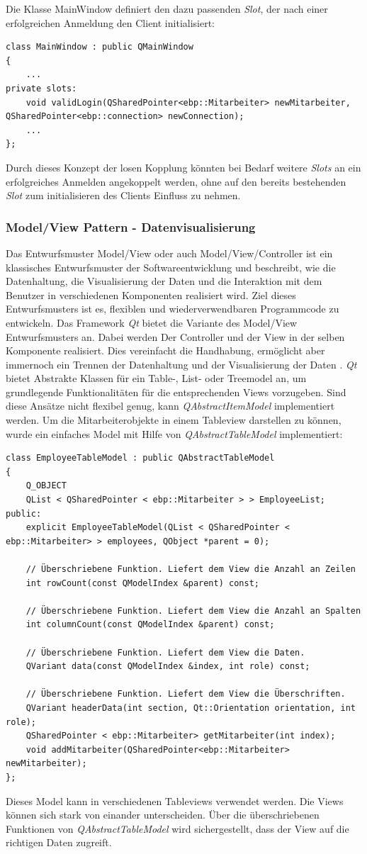 Die Klasse MainWindow definiert den dazu passenden \textit{Slot}, der nach einer erfolgreichen Anmeldung den Client initialisiert:
\begin{lstlisting}
class MainWindow : public QMainWindow
{
    ...
private slots:
    void validLogin(QSharedPointer<ebp::Mitarbeiter> newMitarbeiter, QSharedPointer<ebp::connection> newConnection);
    ...
};
\end{lstlisting}
Durch dieses Konzept der losen Kopplung könnten bei Bedarf weitere \textit{Slots} an ein erfolgreiches Anmelden angekoppelt werden, ohne auf den bereits bestehenden \textit{Slot} zum initialisieren des Clients Einfluss zu nehmen.
\subsubsection{Model/View Pattern - Datenvisualisierung}
Das Entwurfsmuster Model/View oder auch Model/View/Controller ist ein klassisches Entwurfsmuster der Softwareentwicklung und beschreibt, wie die Datenhaltung, die Visualisierung der Daten und die Interaktion mit dem Benutzer in verschiedenen Komponenten realisiert wird. Ziel dieses Entwurfsmusters ist es, flexiblen und wiederverwendbaren Programmcode zu entwickeln.
Das Framework \textit{Qt} bietet die Variante des Model/View Entwurfsmusters an. Dabei werden Der Controller und der View in der selben Komponente realisiert. Dies vereinfacht die Handhabung, ermöglicht aber immernoch ein Trennen der Datenhaltung und der Visualisierung der Daten \cite[Vgl.]{QtModelView}.
\textit{Qt} bietet Abstrakte Klassen für ein Table-, List- oder Treemodel an, um grundlegende Funktionalitäten für die entsprechenden Views vorzugeben. Sind diese Ansätze nicht flexibel genug, kann \textit{QAbstractItemModel} implementiert werden. Um die Mitarbeiterobjekte in einem Tableview darstellen zu können, wurde ein einfaches Model mit Hilfe von \textit{QAbstractTableModel} implementiert:
\begin{lstlisting}
class EmployeeTableModel : public QAbstractTableModel
{
    Q_OBJECT
    QList < QSharedPointer < ebp::Mitarbeiter > > EmployeeList;
public:
    explicit EmployeeTableModel(QList < QSharedPointer < ebp::Mitarbeiter> > employees, QObject *parent = 0);
    
    // Überschriebene Funktion. Liefert dem View die Anzahl an Zeilen    
    int rowCount(const QModelIndex &parent) const;

    // Überschriebene Funktion. Liefert dem View die Anzahl an Spalten
    int columnCount(const QModelIndex &parent) const;

    // Überschriebene Funktion. Liefert dem View die Daten.
    QVariant data(const QModelIndex &index, int role) const;

    // Überschriebene Funktion. Liefert dem View die Überschriften.
    QVariant headerData(int section, Qt::Orientation orientation, int role);
    QSharedPointer < ebp::Mitarbeiter> getMitarbeiter(int index);
    void addMitarbeiter(QSharedPointer<ebp::Mitarbeiter> newMitarbeiter);
};
\end{lstlisting}
Dieses Model kann in verschiedenen Tableviews verwendet werden. Die Views können sich stark von einander unterscheiden. Über die überschriebenen Funktionen von \textit{QAbstractTableModel} wird sichergestellt, dass der View auf die richtigen Daten zugreift.
\newpage
